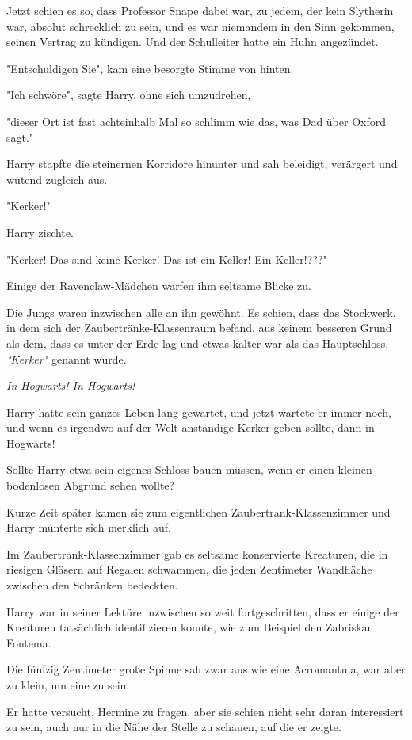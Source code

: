 {Jetzt schien es so, dass Professor Snape dabei war, zu jedem, der kein Slytherin war, absolut schrecklich zu sein, und es war niemandem in den Sinn gekommen, seinen Vertrag zu kündigen. Und der Schulleiter hatte ein Huhn angezündet.

"Entschuldigen Sie", kam eine besorgte Stimme von hinten.

"Ich schwöre", sagte Harry, ohne sich umzudrehen,

"dieser Ort ist fast achteinhalb Mal so schlimm wie das, was Dad über Oxford sagt."

Harry stapfte die steinernen Korridore hinunter und sah beleidigt, verärgert und wütend zugleich aus.

"Kerker!"

Harry zischte.

"Kerker! Das sind keine Kerker! Das ist ein Keller! Ein Keller!???"

Einige der Ravenclaw-Mädchen warfen ihm seltsame Blicke zu.

Die Jungs waren inzwischen alle an ihn gewöhnt. Es schien, dass das Stockwerk, in dem sich der Zaubertränke-Klassenraum befand, aus keinem besseren Grund als dem, dass es unter der Erde lag und etwas kälter war als das Hauptschloss, \emph{"Kerker"} genannt wurde.

\emph{In Hogwarts! In Hogwarts!}

Harry hatte sein ganzes Leben lang gewartet, und jetzt wartete er immer noch, und wenn es irgendwo auf der Welt anständige Kerker geben sollte, dann in Hogwarts!

Sollte Harry etwa sein eigenes Schloss bauen müssen, wenn er einen kleinen bodenlosen Abgrund sehen wollte?

Kurze Zeit später kamen sie zum eigentlichen Zaubertrank-Klassenzimmer und Harry munterte sich merklich auf.

Im Zaubertrank-Klassenzimmer gab es seltsame konservierte Kreaturen, die in riesigen Gläsern auf Regalen schwammen, die jeden Zentimeter Wandfläche zwischen den Schränken bedeckten.

Harry war in seiner Lektüre inzwischen so weit fortgeschritten, dass er einige der Kreaturen tatsächlich identifizieren konnte, wie zum Beispiel den Zabriskan Fontema.

Die fünfzig Zentimeter große Spinne sah zwar aus wie eine Acromantula, war aber zu klein, um eine zu sein.

Er hatte versucht, Hermine zu fragen, aber sie schien nicht sehr daran interessiert zu sein, auch nur in die Nähe der Stelle zu schauen, auf die er zeigte.

}
